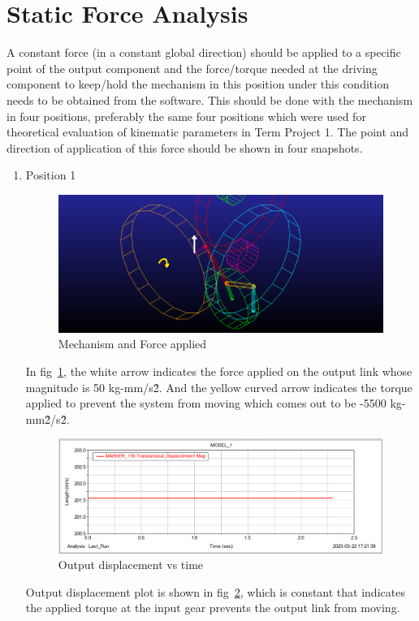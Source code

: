 \section{Static Force Analysis} 
    A constant force (in a constant global direction) should be applied to a specific point of the output component and the force/torque needed at the driving component to keep/hold the mechanism in this position under this condition needs to be obtained from the software. This should be done with the mechanism in four positions, preferably the same four positions which were used for theoretical evaluation of kinematic parameters in Term Project 1. The point and direction of application of this force should be shown in four snapshots.

    \begin{enumerate}
        \item Position 1 
            \begin{figure}[hbt!]
                \centering
                \includegraphics[width=0.9\columnwidth]{Images/Force_pos0.png}
                \caption{Mechanism and Force applied}
                \label{fig:force_applied}
            \end{figure}
            In fig~\ref{fig:force_applied}, the white arrow indicates the force applied on the output link whose magnitude is 50 kg-mm/s\^2. And the yellow curved arrow indicates the torque applied to prevent the system from moving which comes out to be -5500 kg-mm\^2/s\^2.
            \begin{figure}[hbt!]
                \centering
                \includegraphics[width=0.9\columnwidth]{Images/Steady_output.png}
                \caption{Output displacement vs time}
                \label{fig:steady_out}
            \end{figure}
            Output displacement plot is shown in fig~\ref{fig:steady_out}, which is constant that indicates the applied torque at the input gear prevents the output link from moving.
            
    \end{enumerate}
            